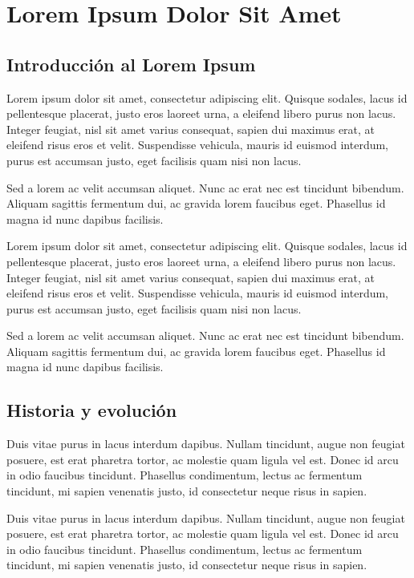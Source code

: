 \chapter{Lorem Ipsum Dolor Sit Amet}
\setcounter{PrimPag}{\theCurrentPage}

\section{Introducción al Lorem Ipsum}

Lorem ipsum dolor sit amet, consectetur adipiscing elit. Quisque sodales, lacus id pellentesque placerat, justo eros laoreet urna, a eleifend libero purus non lacus. Integer feugiat, nisl sit amet varius consequat, sapien dui maximus erat, at eleifend risus eros et velit. Suspendisse vehicula, mauris id euismod interdum, purus est accumsan justo, eget facilisis quam nisi non lacus.

Sed a lorem ac velit accumsan aliquet. Nunc ac erat nec est tincidunt bibendum. Aliquam sagittis fermentum dui, ac gravida lorem faucibus eget. Phasellus id magna id nunc dapibus facilisis.

Lorem ipsum dolor sit amet, consectetur adipiscing elit. Quisque sodales, lacus id pellentesque placerat, justo eros laoreet urna, a eleifend libero purus non lacus. Integer feugiat, nisl sit amet varius consequat, sapien dui maximus erat, at eleifend risus eros et velit. Suspendisse vehicula, mauris id euismod interdum, purus est accumsan justo, eget facilisis quam nisi non lacus.

Sed a lorem ac velit accumsan aliquet. Nunc ac erat nec est tincidunt bibendum. Aliquam sagittis fermentum dui, ac gravida lorem faucibus eget. Phasellus id magna id nunc dapibus facilisis.

\section{Historia y evolución}

Duis vitae purus in lacus interdum dapibus. Nullam tincidunt, augue non feugiat posuere, est erat pharetra tortor, ac molestie quam ligula vel est. Donec id arcu in odio faucibus tincidunt. Phasellus condimentum, lectus ac fermentum tincidunt, mi sapien venenatis justo, id consectetur neque risus in sapien.

Duis vitae purus in lacus interdum dapibus. Nullam tincidunt, augue non feugiat posuere, est erat pharetra tortor, ac molestie quam ligula vel est. Donec id arcu in odio faucibus tincidunt. Phasellus condimentum, lectus ac fermentum tincidunt, mi sapien venenatis justo, id consectetur neque risus in sapien.

